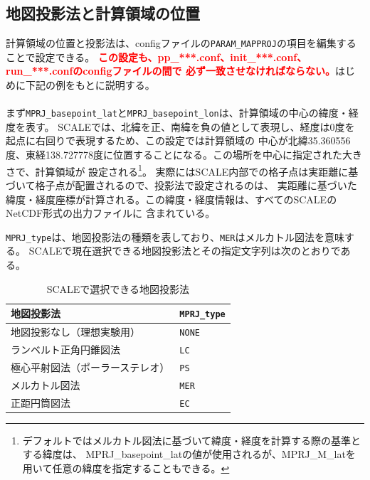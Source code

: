 \subsection{地図投影法と計算領域の位置} \label{sec:adv_mapproj}
計算領域の位置と投影法は、configファイルの\verb|PARAM_MAPPROJ|の項目を編集することで設定できる。
\textcolor{red}{\bf この設定も、pp\_***.conf、init\_***.conf、run\_***.confのconfigファイルの間で
必ず一致させなければならない。}はじめに下記の例をもとに説明する。\\

\\

\noindent まず\verb|MPRJ_basepoint_lat|と\verb|MPRJ_basepoint_lon|は、計算領域の中心の緯度・経度を表す。
SCALEでは、北緯を正、南緯を負の値として表現し、経度は0度を起点に右回りで表現するため、この設定では計算領域の
中心が北緯35.360556度、東経138.727778度に位置することになる。この場所を中心に指定された大きさで、計算領域が
設定される\footnote{デフォルトではメルカトル図法に基づいて緯度・経度を計算する際の基準とする緯度は、
MPRJ\_basepoint\_latの値が使用されるが、MPRJ\_M\_latを用いて任意の緯度を指定することもできる。}。
実際にはSCALE内部での格子点は実距離に基づいて格子点が配置されるので、投影法で設定されるのは、
実距離に基づいた緯度・経度座標が計算される。この緯度・経度情報は、すべてのSCALEのNetCDF形式の出力ファイルに
含まれている。

\verb|MPRJ_type|は、地図投影法の種類を表しており、\verb|MER|はメルカトル図法を意味する。
SCALEで現在選択できる地図投影法とその指定文字列は次のとおりである。

\begin{table}[htb]
\begin{center}
\caption{SCALEで選択できる地図投影法}
\begin{tabularx}{150mm}{|l|X|} \hline
 \rowcolor[gray]{0.9} 地図投影法 & \verb|MPRJ_type| \\ \hline
 地図投影なし（理想実験用）& \verb|NONE| \\ \hline
 ランベルト正角円錐図法 & \verb|LC| \\ \hline
 極心平射図法（ポーラーステレオ） & \verb|PS| \\ \hline
 メルカトル図法 & \verb|MER| \\ \hline
 正距円筒図法 & \verb|EC| \\ \hline
\end{tabularx}
\label{tab:map_proj}
\end{center}
\end{table}

